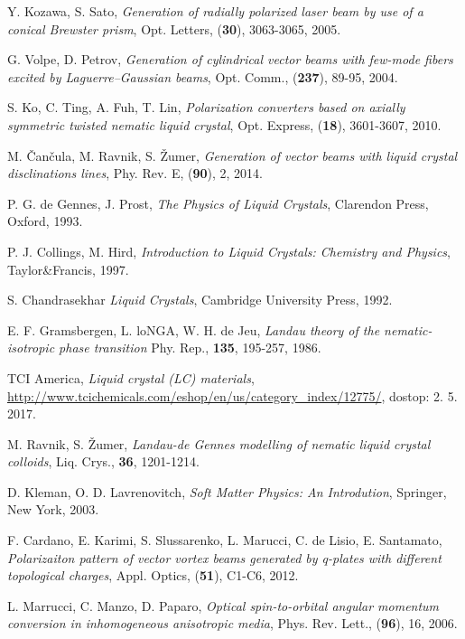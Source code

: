 \documentclass[longbibliography,slovene,a4paper,12pt]{book}
\begin{document}
\begin{thebibliography}{15}
	Y. Kozawa, S. Sato,
	\emph{Generation of radially polarized laser beam by use of a conical Brewster prism},
	Opt. Letters, (\textbf{30}), 3063-3065, 2005.

	G. Volpe, D. Petrov,
	\emph{Generation of cylindrical vector beams with few-mode fibers excited by Laguerre–Gaussian beams},
	Opt. Comm., (\textbf{237}), 89-95, 2004.
	
	S. Ko, C. Ting, A. Fuh, T. Lin,
	\emph{Polarization converters based on axially symmetric twisted nematic liquid crystal},
	Opt. Express, (\textbf{18}), 3601-3607, 2010.

	M. Čančula, M. Ravnik, S. Žumer,
	\emph{Generation of vector beams with liquid crystal disclinations lines},
	Phy. Rev. E, (\textbf{90}), 2, 2014. 

	P. G. de Gennes, J. Prost,
	\emph{The Physics of Liquid Crystals},
	Clarendon Press, Oxford, 1993.
	
	P. J. Collings, M. Hird,
	\emph{Introduction to Liquid Crystals: Chemistry and Physics},
	Taylor\&Francis, 1997.
	
	S. Chandrasekhar
	\emph{Liquid Crystals},
	Cambridge University Press, 1992.
	
	E. F. Gramsbergen, L. loNGA, W. H. de Jeu,
	\emph{Landau theory of the nematic-isotropic phase transition}
	Phy. Rep., \textbf{135}, 195-257, 1986.
	
	TCI America,
	\emph{Liquid crystal (LC) materials},
	\url{http://www.tcichemicals.com/eshop/en/us/category_index/12775/}, dostop: 2. 5. 2017.

	M. Ravnik, S. Žumer,
	\emph{Landau-de Gennes modelling of nematic liquid crystal colloids},
	Liq. Crys., \textbf{36}, 1201-1214.
	
	D. Kleman, O. D. Lavrenovitch,
	\emph{Soft Matter Physics: An Introdution},
	Springer, New York, 2003.

	F. Cardano, E. Karimi, S. Slussarenko, L. Marucci, C. de Lisio, E. Santamato,
	\emph{Polarizaiton pattern of vector vortex beams generated by q-plates with different topological charges},
	Appl. Optics, (\textbf{51}), C1-C6, 2012.
	
	L. Marrucci, C. Manzo, D. Paparo,
	\emph{Optical spin-to-orbital angular momentum conversion in inhomogeneous anisotropic media},
	Phys. Rev. Lett., (\textbf{96}), 16, 2006.


\end{thebibliography}
\end{document}
